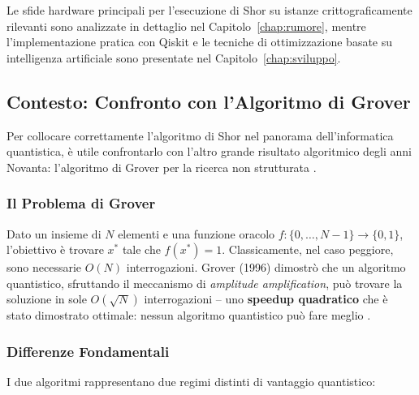 Le sfide hardware principali per l'esecuzione di Shor su istanze crittograficamente rilevanti sono analizzate in dettaglio nel Capitolo~\ref{chap:rumore}, mentre l'implementazione pratica con Qiskit e le tecniche di ottimizzazione basate su intelligenza artificiale sono presentate nel Capitolo~\ref{chap:sviluppo}.
\clearpage

\subsection{Contesto: Confronto con l'Algoritmo di Grover}

Per collocare correttamente l'algoritmo di Shor nel panorama dell'informatica quantistica, è utile confrontarlo con l'altro grande risultato algoritmico degli anni Novanta: l'algoritmo di Grover per la ricerca non strutturata \cite{grover1996}.

\subsubsection{Il Problema di Grover}

Dato un insieme di $N$ elementi e una funzione oracolo $f:\{0,\ldots,N-1\}\to\{0,1\}$, l'obiettivo è trovare $x^*$ tale che $f(x^*)=1$. Classicamente, nel caso peggiore, sono necessarie $O(N)$ interrogazioni. Grover (1996) dimostrò che un algoritmo quantistico, sfruttando il meccanismo di \textit{amplitude amplification}, può trovare la soluzione in sole $O(\sqrt{N})$ interrogazioni -- uno \textbf{speedup quadratico} che è stato dimostrato ottimale: nessun algoritmo quantistico può fare meglio \cite{bennett1997,zalka1999}.

\subsubsection{Differenze Fondamentali}

I due algoritmi rappresentano due regimi distinti di vantaggio quantistico:

